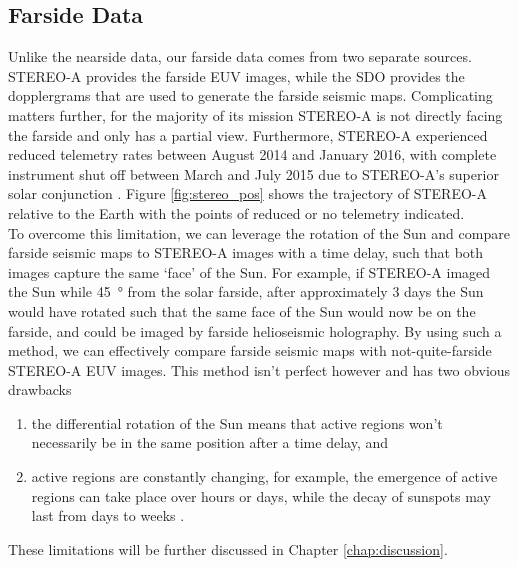 \documentclass[11pt,a4paper,onecolumn]{report}
\begin{document}
\subsection{Farside Data}
Unlike the nearside data, our farside data comes from two separate sources.
STEREO-A provides the farside EUV images, while the SDO provides the
dopplergrams that are used to generate the farside seismic maps. Complicating
matters further, for the majority of its mission STEREO-A is not directly
facing the farside and only has a partial view. Furthermore, STEREO-A experienced
reduced telemetry rates between August 2014 and January 2016, with complete
instrument shut off between March and July 2015 due to STEREO-A's superior
solar conjunction \citep{ossing_stereo_2017}. Figure \ref{fig:stereo_pos} shows
the trajectory of STEREO-A relative to the Earth with the points of reduced or no
telemetry indicated. \\

To overcome this limitation, we can leverage the rotation of the Sun and compare
farside seismic maps to STEREO-A images with a time delay, such that both images
capture the same `face' of the Sun. For example, if STEREO-A imaged the Sun while
\SI[]{45}[]{\degree} from the solar farside, after approximately 3 days the Sun
would have rotated such that the same face of the Sun would now be on the
farside, and could be imaged by farside helioseismic holography. By using such a
method, we can effectively compare farside seismic maps with not-quite-farside
STEREO-A EUV images. This method isn't perfect however and has two obvious drawbacks
\begin{enumerate}
  \item the differential rotation of the Sun means that active regions won't
  necessarily be in the same position after a time delay, and
  \item active regions are constantly changing, for example, the emergence of
  active regions can take place over hours or days, while the decay of
  sunspots may last from days to weeks
  \citep{van_driel-gesztelyi_evolution_2015}.
\end{enumerate}
These limitations will be further discussed in Chapter \ref{chap:discussion}. \\
\end{document}
